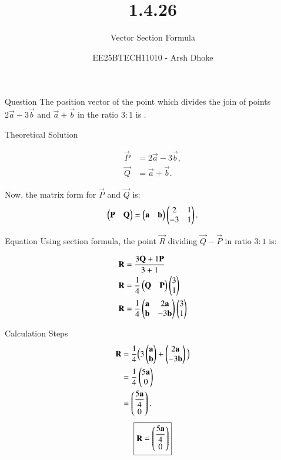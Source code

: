 \documentclass{beamer}
\title{1.4.26}
\subtitle{Vector Section Formula}
\author{EE25BTECH11010 - Arsh Dhoke}
\date{}
\begin{document}
\begin{frame}
\titlepage
\end{frame}

\begin{frame}{Question}
The position vector of the point which divides the join of points 
$2\vec{a} - 3\vec{b}$ and $\vec{a} + \vec{b}$
in the ratio $3:1$ is \underline{\hspace{2cm}}.
\end{frame}

\begin{frame}{Theoretical Solution}

\begin{align}
    \vec{P} &= 2\vec{a}-3\vec{b},  \label{eq:1} \\ 
    \vec{Q} &= \vec{a}+\vec{b}. \label{eq:2}
\end{align}

Now, the matrix form for $\vec{P}$ and $\vec{Q}$ is:
\begin{align}
\begin{pmatrix}\mathbf{P} & \mathbf{Q}\end{pmatrix}
= \begin{pmatrix}\mathbf{a} & \mathbf{b}\end{pmatrix}
\begin{pmatrix}2 & 1 \\ -3 & 1\end{pmatrix}. \label{eq:3}
\end{align}
\end{frame}

\begin{frame}{Equation}
Using section formula, the point $\vec{R}$ dividing $\vec{Q} - \vec{P}$ in ratio $3:1$ is:

\begin{align}
\mathbf{R} &= \frac{3\mathbf{Q} + 1\mathbf{P}}{3+1} \label{eq:4} \\
\mathbf{R} &= \frac{1}{4}\begin{pmatrix}\mathbf{Q} & \mathbf{P}\end{pmatrix} \begin{pmatrix}3 \\ 1\end{pmatrix}\label{eq:5} \\
\mathbf{R} &= \frac{1}{4} \begin{pmatrix}\mathbf{a} & 2\mathbf{a} \\ \mathbf{b} & -3\mathbf{b}\end{pmatrix}  \begin{pmatrix}3 \\ 1\end{pmatrix}\label{eq:6}
\end{align}

\end{frame}

\begin{frame}{Calculation Steps}
\begin{align}
\mathbf{R} &= \frac{1}{4}\Big(3\begin{pmatrix}\mathbf{a} \\ \mathbf{b}\end{pmatrix} + \begin{pmatrix}2\mathbf{a} \\ -3\mathbf{b}\end{pmatrix}\Big) \label{eq:7} \\
&= \frac{1}{4}\begin{pmatrix} 5\mathbf{a} \\ 0 \end{pmatrix} \label{eq:8} \\
&= \begin{pmatrix} \dfrac{5\mathbf{a}}{4} \\ 0 \end{pmatrix}. \label{eq:9}
\end{align}
\[
\boxed{\mathbf{R} = \begin{pmatrix} \dfrac{5\mathbf{a}}{4} \\ 0 \end{pmatrix}}
\]
\end{frame}
\end{document}
